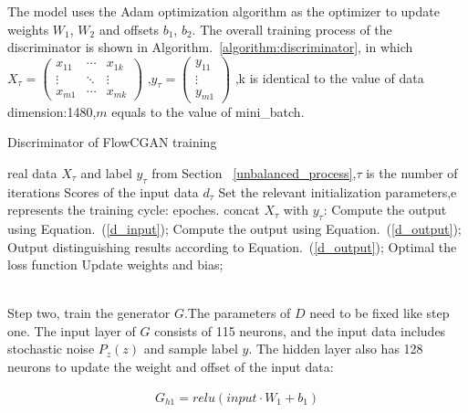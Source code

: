 \documentclass[conference]{IEEEtran}
\begin{document}
The model uses the Adam optimization algorithm as the optimizer to update weights $W_1$, $W_2$ and offsets $b_1$,  $b_2$. The overall training process of the discriminator is shown in Algorithm.~\ref{algorithm:discriminator}, in which $X_{\tau}=\begin{pmatrix}
x_{11}&\cdots&x_{1k}\\
\vdots&\ddots&\vdots\\
x_{m1}&\cdots&x_{mk}
\end{pmatrix}$
,$y_{\tau}=\begin{pmatrix}
y_{11}\\
\vdots\\
y_{m1}
\end{pmatrix}$
,k is identical to the value of data dimension:1480,$m$ equals to the value of mini\_batch.

\begin{algorithm}[htbp]
	\caption{Discriminator of FlowCGAN training}  \label{algorithm:discriminator}
	\begin{algorithmic}[1]  
		\REQUIRE real data $X_{\tau}$ and label $y_{\tau}$ from Section ~\ref{unbalanced_process},$\tau$ is the number of iterations
		\ENSURE Scores of the input data $d_{\tau}$
		\STATE Set the relevant initialization parameters,e represents the training cycle: epoches.
		\STATE concat $X_\tau$ with $y_\tau$: 
		\STATE Compute the output using Equation.~(\ref{d_input});
		\STATE Compute the output using Equation.~(\ref{d_output});
		\STATE Output distinguishing results according to Equation.~(\ref{d_output});
		\STATE Optimal the loss function
		\STATE Update weights and bias;
		\ENDFOR \\ %
		\ENDFOR \\ %
	\end{algorithmic}  
\end{algorithm}  

Step two, train the generator $G$.The parameters of $D$ need to be fixed like step one. The input layer of $G$ consists of 115 neurons, and the input data includes stochastic noise $P_z(z)$ and sample label $y$. The hidden layer also has 128 neurons to update the weight and offset of the input data:

\begin{equation}
\begin{split}
\label{g_input}
 G_{h1}=relu(input\cdot W_1+b_1)
\end{split}
\end{equation}
\end{document}
